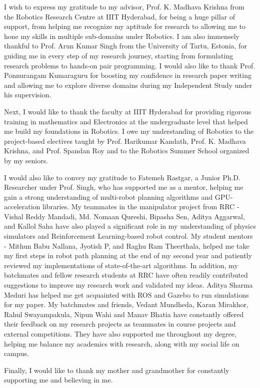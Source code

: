 I wish to express my gratitude to my advisor, Prof. K. Madhava Krishna from the Robotics Research Centre at IIIT Hyderabad, for being a huge pillar of support, from helping me recognize my aptitude for research to allowing me to hone my skills in multiple sub-domains under Robotics. I am also immensely thankful to Prof. Arun Kumar Singh from the University of Tartu, Estonia, for guiding me in every step of my research journey, starting from formulating research problems to hands-on pair programming. I would also like to thank Prof. Ponnurangam Kumaraguru for boosting my confidence in research paper writing and allowing me to explore diverse domains during my Independent Study under his supervision.

Next, I would like to thank the faculty at IIIT Hyderabad for providing rigorous training in mathematics and Electronics at the undergraduate level that helped me build my foundations in Robotics. I owe my understanding of Robotics to the project-based electives taught by Prof. Harikumar Kandath, Prof. K. Madhava Krishna, and Prof. Spandan Roy and to the Robotics Summer School organized by my seniors. 


I would also like to convey my gratitude to Fatemeh Rastgar, a Junior Ph.D. Researcher under Prof. Singh, who has supported me as a mentor, helping me gain a strong understanding of multi-robot planning algorithms and GPU-acceleration libraries. My teammates in the manipulator project from RRC - Vishal Reddy Mandadi, Md. Nomaan Qureshi, Bipasha Sen, Aditya Aggarwal, and Kallol Saha have also played a significant role in my understanding of physics simulators and Reinforcement Learning-based robot control. My student mentors - Mithun Babu Nallana, Jyotish P, and Raghu Ram Theerthala, helped me take my first steps in robot path planning at the end of my second year and patiently reviewed my implementations of state-of-the-art algorithms. In addition, my batchmates and fellow research students at RRC have often readily contributed suggestions to improve my research work and validated my ideas. Aditya Sharma Meduri has helped me get acquainted with ROS and Gazebo to run simulations for my paper. My batchmates and friends, Vedant Mundheda, Karan Mirakhor, Rahul Swayampakula, Nipun Wahi and Manav Bhatia have constantly offered their feedback on my research projects as teammates in course projects and external competitions. They have also supported me throughout my degree, helping me balance my academics with research, along with my social life on campus.

Finally, I would like to thank my mother and grandmother for constantly supporting me and believing in me. 
